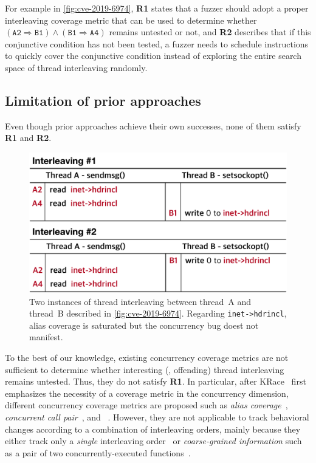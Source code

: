 For example in \autoref{fig:cve-2019-6974}, \textbf{R1} states that a
fuzzer should adopt a proper interleaving coverage metric that can be
used to determine whether
$(\texttt{A2} \Rightarrow \texttt{B1}) \wedge (\texttt{B1} \Rightarrow
\texttt{A4})$ remains untested or not, and \textbf{R2} describes that
if this conjunctive condition has not been tested, a fuzzer needs to
schedule instructions to quickly cover the conjunctive condition
instead of exploring the entire search space of thread interleaving
randomly.


\subsection{Limitation of prior approaches}
\label{ss:existingapproaches}

Even though prior approaches achieve their own successes, none of them
satisfy \textbf{R1} and \textbf{R2}.

%
\begin{figure}[t]
  \centering
  \includegraphics[width=0.95\linewidth]{fig/alias-coverage.pdf}
  \caption{Two instances of thread interleaving between thread~A and
    thread~B described in \autoref{fig:cve-2019-6974}. Regarding
    \texttt{inet->hdrincl}, alias coverage is saturated but the
    concurrency bug doest not manifest.}
  \label{fig:alias-coverage}
\end{figure}
%
To the best of our knowledge, existing concurrency coverage metrics
are not sufficient to determine whether interesting (\ie, offending)
thread interleaving remains untested. Thus, they do not satisfy
\textbf{R1}.
%
In particular, after KRace~\cite{krace} first emphasizes the necessity
of a coverage metric in the concurrency dimension, different
concurrency coverage metrics are proposed such as \textit{alias
  coverage}~\cite{krace}, \textit{concurrent call
  pair}~\cite{conzzer}, and \textit{}~\cite{muzz}.
%
However, they are not applicable to track behavioral changes according
to a combination of interleaving orders, mainly because they either
track only a \textit{single} interleaving order~\cite{krace, muzz} or
\textit{coarse-grained information} such as a pair of two
concurrently-executed functions~\cite{conzzer}.

